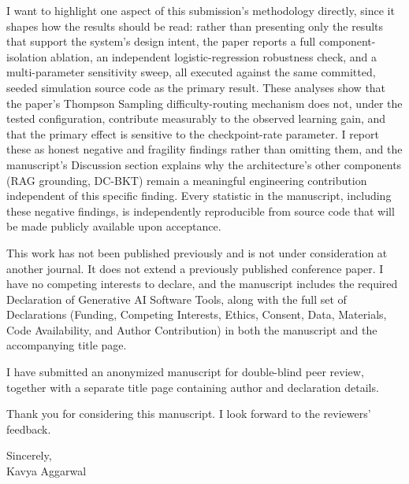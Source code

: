 \documentclass[11pt]{article}
\begin{document}
\vspace{0.6em}
\noindent
I want to highlight one aspect of this submission's methodology directly, since it shapes how the results should be read: rather than presenting only the results that support the system's design intent, the paper reports a full component-isolation ablation, an independent logistic-regression robustness check, and a multi-parameter sensitivity sweep, all executed against the same committed, seeded simulation source code as the primary result. These analyses show that the paper's Thompson Sampling difficulty-routing mechanism does not, under the tested configuration, contribute measurably to the observed learning gain, and that the primary effect is sensitive to the checkpoint-rate parameter. I report these as honest negative and fragility findings rather than omitting them, and the manuscript's Discussion section explains why the architecture's other components (RAG grounding, DC-BKT) remain a meaningful engineering contribution independent of this specific finding. Every statistic in the manuscript, including these negative findings, is independently reproducible from source code that will be made publicly available upon acceptance.

\vspace{0.6em}
\noindent
This work has not been published previously and is not under consideration at another journal. It does not extend a previously published conference paper. I have no competing interests to declare, and the manuscript includes the required Declaration of Generative AI Software Tools, along with the full set of Declarations (Funding, Competing Interests, Ethics, Consent, Data, Materials, Code Availability, and Author Contribution) in both the manuscript and the accompanying title page.

\vspace{0.6em}
\noindent
I have submitted an anonymized manuscript for double-blind peer review, together with a separate title page containing author and declaration details.

\vspace{0.6em}
\noindent
Thank you for considering this manuscript. I look forward to the reviewers' feedback.

\vspace{0.6em}
\noindent
Sincerely, \\
Kavya Aggarwal
\end{document}
